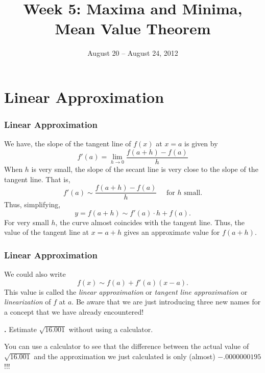 \documentclass[t]{beamer}
\title{Week 5:  Maxima and Minima, Mean Value Theorem}
\date{August 20 -- August 24, 2012}
\theoremstyle{plain}
\theoremstyle{definition}
\newcounter{heading}
\newcommand{\newhead}[1]{\medskip\stepcounter{heading}\noindent\textbf{\hspace{0.2cm}{#1}.}}
\begin{document}
\frame{\titlepage}

\setcounter{tocdepth}{2}


\section{Linear Approximation}
\frame
{
\frametitle{Linear Approximation}
We have, the slope of the tangent line of $f(x)$ at $x=a$ is given by
\[ f'(a)=\lim_{h\to 0}\frac{f(a+h)-f(a)}{h} \] \pause
When $h$ is very small, the slope of the secant line is very close to the slope of the tangent line. \pause That is,
\[ f'(a)\sim\frac{f(a+h)-f(a)}{h}\quad\text{ for }h\text{ small.} \]\pause Thus, simplifying,
\[ y=f(a+h)\sim f'(a)\cdot h +f(a). \] \pause
For very small $h$, the curve almost coincides with the tangent line. Thus, the value of the tangent line at $x=a+h$
gives an approximate value for $f(a+h)$. 
}

\frame
{
\frametitle{Linear Approximation}
We could also write $$f(x) \sim f(a) + f'(a)(x-a).$$ This value is called the {\em linear approximation}  or \emph{tangent line approximation} or {\em linearization} of $f$ at $a$.  Be aware that we are just introducing three new names for a concept that we have already encountered!  \pause



\newhead{Example} Estimate $\sqrt{16.001}$ without using a calculator.\pause

\vfill



\noindent You can use a calculator to see that the difference between the actual value of $\sqrt{16.001}$ and the approximation we just calculated is only (almost) $-.0000000195$!!!
}
\end{document}
